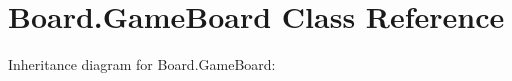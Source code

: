 \hypertarget{class_board_1_1_game_board}{}\section{Board.\+Game\+Board Class Reference}
\label{class_board_1_1_game_board}


Inheritance diagram for Board.\+Game\+Board\+:
